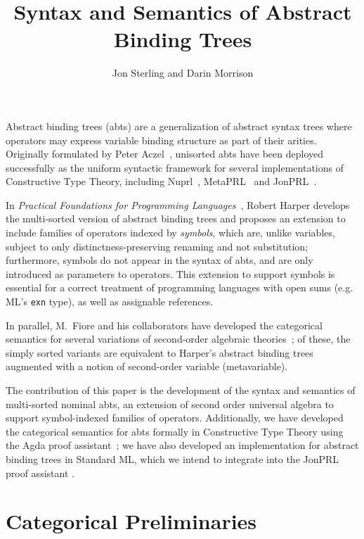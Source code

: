 \documentclass[11pt]{article}
\theoremstyle{definition}
\theoremstyle{remark}
\numberwithin{equation}{section}
\begin{document}
\title{Syntax and Semantics of Abstract Binding Trees}
\date{}
\author{Jon Sterling and Darin Morrison}
\maketitle

Abstract binding trees (abts) are a generalization of abstract syntax trees
where operators may express variable binding structure as part of their arities.
Originally formulated by Peter Aczel~\cite{aczel:1978}, unisorted abts have been
deployed successfully as the uniform syntactic framework for several
implementations of Constructive Type Theory, including
Nuprl~\cite{constable:1986}, MetaPRL~\cite{hickey:2003} and
JonPRL~\cite{jonprl:2015}.

In \emph{Practical Foundations for Programming Languages}~\cite{harper:2016},
Robert Harper develops the multi-sorted version of abstract binding trees and
proposes an extension to include families of operators indexed by
\emph{symbols}, which are, unlike variables, subject to only
distinctness-preserving renaming and not substitution; furthermore, symbols do
not appear in the syntax of abts, and are only introduced as parameters to
operators. This extension to support symbols is essential for a correct
treatment of programming languages with open sums (e.g. ML's \texttt{exn} type),
as well as assignable references.

In parallel, M.\ Fiore and his collaborators have developed the categorical
semantics for several variations of second-order algebraic
theories~\cite{fiore:1999, fiore:2005, fiore-hur:2010, fiore-mamoud:2010}; of
these, the simply sorted variants are equivalent to Harper's abstract binding
trees augmented with a notion of second-order variable (metavariable).

The contribution of this paper is the development of the syntax and semantics
of multi-sorted nominal abts, an extension of second order universal algebra to
support symbol-indexed families of operators. Additionally, we have developed
the categorical semantics for abts formally in Constructive Type Theory using
the Agda proof assistant~\cite{norell:2007}; we have also developed an
implementation for abstract binding trees in Standard ML, which we intend to
integrate into the JonPRL proof assistant \cite{jonprl:2015}.

\section{Categorical Preliminaries}
\end{document}
